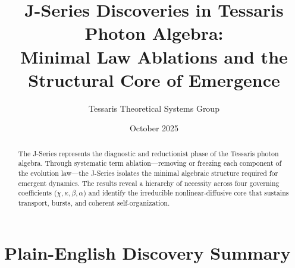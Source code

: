 \documentclass[12pt]{article}
\begin{document}
\title{\textbf{J-Series Discoveries in Tessaris Photon Algebra:\\
Minimal Law Ablations and the Structural Core of Emergence}}
\author{Tessaris Theoretical Systems Group}
\date{October 2025}
\maketitle

\begin{abstract}
The J-Series represents the diagnostic and reductionist phase of the Tessaris photon algebra.
Through systematic term ablation---removing or freezing each component of the evolution law---the J-Series isolates the minimal algebraic structure required for emergent dynamics.
The results reveal a hierarchy of necessity across four governing coefficients (\(\chi, \kappa, \beta, \alpha\)) and identify the irreducible nonlinear-diffusive core that sustains transport, bursts, and coherent self-organization.
\end{abstract}
\section*{Plain-English Discovery Summary}
\end{document}
